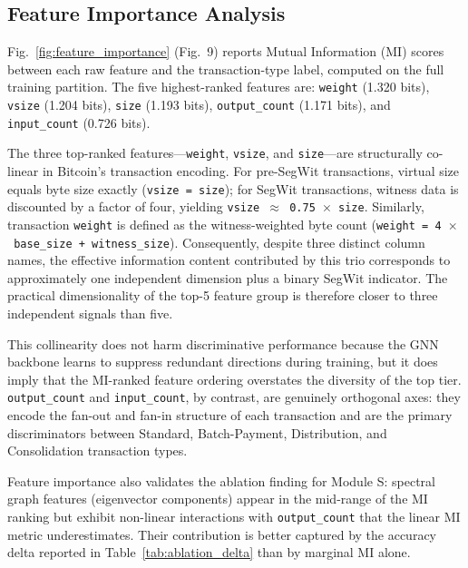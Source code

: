 \documentclass[journal]{IEEEtran}
\begin{document}

\subsection{Feature Importance Analysis}
\label{subsec:feature_importance}

Fig.~\ref{fig:feature_importance} (Fig.~9) reports Mutual Information (MI)
scores between each raw feature and the transaction-type label, computed on
the full training partition.
The five highest-ranked features are:
\texttt{weight} (1.320 bits),
\texttt{vsize} (1.204 bits),
\texttt{size} (1.193 bits),
\texttt{output\_count} (1.171 bits), and
\texttt{input\_count} (0.726 bits).

The three top-ranked features—\texttt{weight}, \texttt{vsize}, and
\texttt{size}—are structurally co-linear in Bitcoin's transaction encoding.
For pre-SegWit transactions, virtual size equals byte size exactly
(\texttt{vsize~=~size}); for SegWit transactions, witness data is discounted
by a factor of four, yielding \texttt{vsize~$\approx$~0.75~$\times$~size}.
Similarly, transaction \texttt{weight} is defined as the witness-weighted
byte count (\texttt{weight~=~4~$\times$~base\_size + witness\_size}).
Consequently, despite three distinct column names, the effective information
content contributed by this trio corresponds to approximately one
independent dimension plus a binary SegWit indicator.
The practical dimensionality of the top-5 feature group is therefore closer
to three independent signals than five.

This collinearity does not harm discriminative performance because
the GNN backbone learns to suppress redundant directions during training,
but it does imply that the MI-ranked feature ordering overstates the
diversity of the top tier.
\texttt{output\_count} and \texttt{input\_count}, by contrast, are
genuinely orthogonal axes: they encode the fan-out and fan-in structure of
each transaction and are the primary discriminators between Standard,
Batch-Payment, Distribution, and Consolidation transaction types.

Feature importance also validates the ablation finding for Module S:
spectral graph features (eigenvector components) appear in the mid-range of
the MI ranking but exhibit non-linear interactions with
\texttt{output\_count} that the linear MI metric underestimates.
Their contribution is better captured by the accuracy delta reported in
Table~\ref{tab:ablation_delta} than by marginal MI alone.
\end{document}
